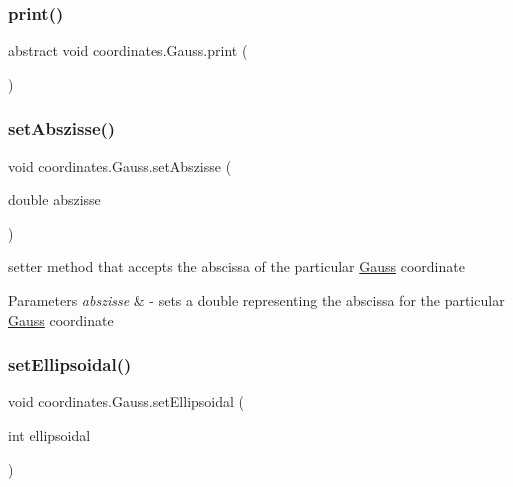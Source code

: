 \mbox{\label{classcoordinates_1_1_gauss_aa088aa6fb796aa873b19ee2c1ef42468}} 
\subsubsection{\texorpdfstring{print()}{print()}}
{\footnotesize\ttfamily abstract void coordinates.\+Gauss.\+print (\begin{DoxyParamCaption}{ }\end{DoxyParamCaption})\hspace{0.3cm}{\ttfamily [abstract]}}

\mbox{\label{classcoordinates_1_1_gauss_a82bc0ee0a9fae9bef4e3400615d50c58}} 
\subsubsection{\texorpdfstring{set\+Abszisse()}{setAbszisse()}}
{\footnotesize\ttfamily void coordinates.\+Gauss.\+set\+Abszisse (\begin{DoxyParamCaption}\item[{double}]{abszisse }\end{DoxyParamCaption})}



setter method that accepts the abscissa of the particular \hyperlink{classcoordinates_1_1_gauss}{Gauss} coordinate 


\begin{DoxyParams}{Parameters}
{\em abszisse} & -\/ sets a double representing the abscissa for the particular \hyperlink{classcoordinates_1_1_gauss}{Gauss} coordinate \\
\hline
\end{DoxyParams}
\mbox{\label{classcoordinates_1_1_gauss_a2bfa95e5913df58667cf5c15db228db8}} 
\subsubsection{\texorpdfstring{set\+Ellipsoidal()}{setEllipsoidal()}}
{\footnotesize\ttfamily void coordinates.\+Gauss.\+set\+Ellipsoidal (\begin{DoxyParamCaption}\item[{int}]{ellipsoidal }\end{DoxyParamCaption})}




